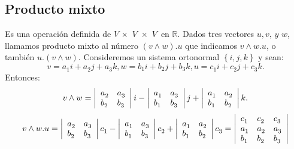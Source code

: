 \subsection{Producto mixto}
\bigskip
Es una operaci\'{o}n definida de $V\, \times \,\,V\,\, \times
\,\,V\,$ en $\mathbb{R}$. Dados tres vectores $u,v, \,y\,\,w$,
llamamos producto mixto al n\'{u}mero $\left( {v \wedge w}
\right).u$ que indicamos $v \wedge w.u$, o tambi\'{e}n $u.\left(
{v \wedge w} \right)$.
\bigskip
Consideremos un sistema ortonormal $\left\{ {i,j,k} \right\}$ y
sean:
\[
v = a_{1}^{} i + a_{2}^{} j + a_{3}^{} k, w = b_{1}^{} i +
b_{2}^{} j + b_{3}^{} k, u = c_{1}^{} i + c_{2}^{} j + c_{3}^{} k.
\]
Entonces:
\[
v \wedge w = \left| {{\begin{array}{*{20}c}
  {a_{2}^{} } \hfill & {a_{3}^{} } \hfill  \\
  {b_{2}^{} } \hfill & {b_{3}^{} } \hfill  \\
\end{array} }} \right|i - \left| {{\begin{array}{*{20}c}
  {a_{1}^{} } \hfill & {a_{3}^{} } \hfill  \\
  {b_{1}^{} } \hfill & {b_{3}^{} } \hfill  \\
\end{array} }} \right|j + \left| {{\begin{array}{*{20}c}
  {a_{1}^{} } \hfill & {a_{2}^{} } \hfill  \\
  {b_{1}^{} } \hfill & {b_{2}^{} } \hfill  \\
\end{array} }} \right|k.
\]
\[
v \wedge w.u = \left| {{\begin{array}{*{20}c}
  {a_{2}^{} } \hfill & {a_{3}^{} } \hfill  \\
  {b_{2}^{} } \hfill & {b_{3}^{} } \hfill  \\
\end{array} }} \right|c_{1}^{}  - \left| {{\begin{array}{*{20}c}
  {a_{1}^{} } \hfill & {a_{3}^{} } \hfill  \\
  {b_{1}^{} } \hfill & {b_{3}^{} } \hfill  \\
\end{array} }} \right|c_{2}^{}  + \left| {{\begin{array}{*{20}c}
  {a_{1}^{} } \hfill & {a_{2}^{} } \hfill  \\
  {b_{1}^{} } \hfill & {b_{2}^{} } \hfill  \\
\end{array} }} \right|c_{3}^{} =
\left| {{\begin{array}{*{20}c}
  {c_{1}^{} } \hfill & {c_{2}^{} } \hfill & {c_{3}^{} } \hfill  \\
  {a_{1}^{} } \hfill & {a_{2}^{} } \hfill & {a_{3}^{} } \hfill  \\
  {b_{1}^{} } \hfill & {b_{2}^{} } \hfill & {b_{3}^{} } \hfill  \\
\end{array} }} \right|
\]

